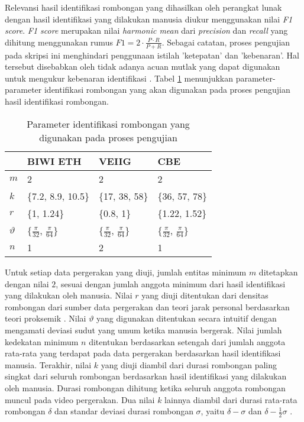Relevansi hasil identifikasi rombongan yang dihasilkan oleh perangkat lunak dengan hasil identifikasi yang dilakukan manusia diukur menggunakan nilai \textit{F1 score}. \textit{F1 score} merupakan nilai \textit{harmonic mean} dari \textit{precision} dan \textit{recall} yang dihitung menggunakan rumus $F1 = 2 \cdot \frac{P \cdot R}{P + R}$. Sebagai catatan, proses pengujian pada skripsi ini menghindari penggunaan istilah 'ketepatan' dan 'kebenaran'. Hal tersebut disebabkan oleh tidak adanya acuan mutlak yang dapat digunakan untuk mengukur kebenaran identifikasi \cite{wiratma:trajectory}. Tabel \ref{bab6:parameter} menunjukkan parameter-parameter identifikasi rombongan yang akan digunakan pada proses pengujian hasil identifikasi rombongan.

\begin{table}[h]
    \centering
    \begin{tabular}{p{1cm} p{2.25cm} p{2.25cm} p{2.25cm}}
        \hline
        & \textbf{BIWI ETH} & \textbf{VEIIG} & \textbf{CBE} \\
        \hline
        $m$ & 2 & 2 & 2 \\
        $k$ & \{7.2, 8.9, 10.5\} & \{17, 38, 58\} & \{36, 57, 78\} \\
        $r$ & \{1, 1.24\} & \{0.8, 1\} & \{1.22, 1.52\} \\
        $\vartheta$ & \{$\frac{\pi}{32}$, $\frac{\pi}{64}$\} & \{$\frac{\pi}{32}$, $\frac{\pi}{64}$\} & \{$\frac{\pi}{32}$, $\frac{\pi}{64}$\} \\
        $n$ & 1 & 2 & 1 \\
        \hline
    \end{tabular}
    \caption[Parameter identifikasi rombongan]{Parameter identifikasi rombongan yang digunakan pada proses pengujian}
    \label{bab6:parameter}
\end{table}

Untuk setiap data pergerakan yang diuji, jumlah entitas minimum $m$ ditetapkan dengan nilai $2$, sesuai dengan jumlah anggota minimum dari hasil identifikasi yang dilakukan oleh manusia. Nilai $r$ yang diuji ditentukan dari densitas rombongan dari sumber data pergerakan \cite{solera:06:range-reference} dan teori jarak personal berdasarkan teori proksemik \cite{hall:06:proxemic}. Nilai $\vartheta$ yang digunakan ditentukan secara intuitif dengan mengamati deviasi sudut yang umum ketika manusia bergerak. Nilai jumlah kedekatan minimum $n$ ditentukan berdasarkan setengah dari jumlah anggota rata-rata yang terdapat pada data pergerakan berdasarkan hasil identifikasi manusia. Terakhir, nilai $k$ yang diuji diambil dari durasi rombongan paling singkat dari seluruh rombongan berdasarkan hasil identifikasi yang dilakukan oleh manusia. Durasi rombongan dihitung ketika seluruh anggota rombongan muncul pada video pergerakan. Dua nilai $k$ lainnya diambil dari durasi rata-rata rombongan $\delta$ dan standar deviasi durasi rombongan $\sigma$, yaitu $\delta - \sigma$ dan $\delta - \frac{1}{2}\sigma$ \cite{wiratma:software}.

